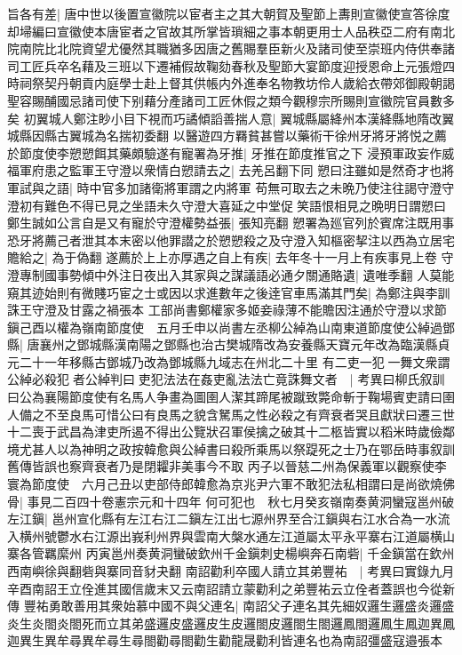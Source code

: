 旨各有差|{
	唐中世以後置宣徽院以宦者主之其大朝賀及聖節上夀則宣徽使宣答徐度却埽編曰宣徽使本唐宦者之官故其所掌皆瑣細之事本朝更用士人品秩亞二府有南北院南院比北院資望尤優然其職猶多因唐之舊賜羣臣新火及諸司使至崇班内侍供奉諸司工匠兵卒名藉及三班以下遷補假故鞠劾春秋及聖節大宴節度迎授恩命上元張燈四時祠祭契丹朝貢内庭學士赴上督其供帳内外進奉名物教坊伶人歲給衣帶郊御殿朝謁聖容賜酺國忌諸司使下别藉分產諸司工匠休假之類今觀穆宗所賜則宣徽院官員數多矣}
初翼城人鄭注眇小目下視而巧譎傾謟善揣人意|{
	翼城縣屬絳州本漢絳縣地隋改翼城縣因縣古翼城為名揣初委翻}
以醫遊四方羇貧甚嘗以藥術干徐州牙將牙將悦之薦於節度使李愬愬餌其藥頗驗遂有寵署為牙推|{
	牙推在節度推官之下}
浸預軍政妄作威福軍府患之監軍王守澄以衆情白愬請去之|{
	去羌呂翻下同}
愬曰注雖如是然奇才也將軍試與之語|{
	時中官多加諸衛將軍謂之内將軍}
苟無可取去之未晩乃使注往謁守澄守澄初有難色不得已見之坐語未久守澄大喜延之中堂促笑語恨相見之晩明日謂愬曰鄭生誠如公言自是又有寵於守澄權勢益張|{
	張知亮翻}
愬署為廵官列於賓席注既用事恐牙將薦己者泄其本末密以他罪譛之於愬愬殺之及守澄入知樞密挈注以西為立居宅贍給之|{
	為于偽翻}
遂薦於上上亦厚遇之自上有疾|{
	去年冬十一月上有疾事見上卷}
守澄專制國事勢傾中外注日夜出入其家與之謀議語必通夕關通賂遺|{
	遺唯季翻}
人莫能窺其迹始則有微賤巧宦之士或因以求進數年之後逹官車馬滿其門矣|{
	為鄭注與李訓誅王守澄及甘露之禍張本}
工部尚書鄭權家多姬妾祿薄不能贍因注通於守澄以求節鎭己酉以權為嶺南節度使　五月壬申以尚書左丞柳公綽為山南東道節度使公綽過鄧縣|{
	唐襄州之鄧城縣漢南陽之鄧縣也治古樊城隋改為安養縣天寶元年改為臨漢縣貞元二十一年移縣古鄧城乃改為鄧城縣九域志在州北二十里}
有二吏一犯一舞文衆謂公綽必殺犯者公綽判曰吏犯法法在姦吏亂法法亡竟誅舞文者　|{
	考異曰柳氏叙訓曰公為襄陽節度使有名馬人争畫為圖圉人潔其蹄尾被蹴致斃命斬于鞠場賓吏請曰圉人備之不至良馬可惜公曰有良馬之貌含駑馬之性必殺之有齊衰者哭且獻狀曰遷三世十二喪于武昌為津吏所遏不得出公覽狀召軍侯擒之破其十二柩皆實以稻米時歲儉鄰境尤甚人以為神明之政按韓愈與公綽書曰殺所乘馬以祭踶死之士乃在鄂岳時事叙訓舊傳皆誤也察齊衰者乃是閉糶非美事今不取}
丙子以晉慈二州為保義軍以觀察使李寰為節度使　六月己丑以吏部侍郎韓愈為京兆尹六軍不敢犯法私相謂曰是尚欲燒佛骨|{
	事見二百四十卷憲宗元和十四年}
何可犯也　秋七月癸亥嶺南奏黄洞蠻寇邕州破左江鎭|{
	邕州宣化縣有左江右江二鎭左江出七源州界至合江鎭與右江水合為一水流入横州號鬱水右江源出峩利州界與雲南大槃水通左江道屬太平永平寨右江道屬横山寨各管羈縻州}
丙寅邕州奏黄洞蠻破欽州千金鎭刺史楊嶼奔石南砦|{
	千金鎭當在欽州西南嶼徐與翻砦與寨同音豺夬翻}
南詔勸利卒國人請立其弟豐祐　|{
	考異曰實錄九月辛酉南詔王立佺進其國信歲末又云南詔請立蒙勸利之弟豐祐云立佺者蓋誤也今從新傳}
豐祐勇敢善用其衆始慕中國不與父連名|{
	南詔父子連名其先細奴邏生邏盛炎邏盛炎生炎閤炎閤死而立其弟盛邏皮盛邏皮生皮邏閤皮邏閤生閤邏鳳閤邏鳳生鳳迦異鳳迦異生異牟尋異牟尋生尋閤勸尋閤勸生勸龍晟勸利皆連名也為南詔彊盛寇邉張本}
